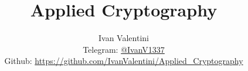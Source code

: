 

\title{\Huge \textbf{Applied Cryptography}}

\author{
  Ivan Valentini \\
  \small Telegram: \href{https://t.me/IvanV1337}{@IvanV1337} \\[3pt]
  \small Github: \href{https://github.com/IvanValentini/Applied_Cryptography}{https://github.com/IvanValentini/Applied\_Cryptography}}


	\maketitle
	\tableofcontents
	
	
	


